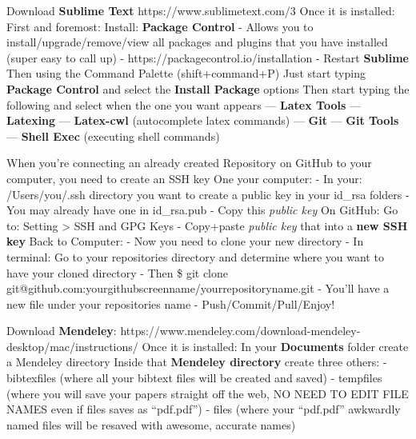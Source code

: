 Download \textbf{Sublime Text} 
https://www.sublimetext.com/3
Once it is installed:
First and foremost: Install: \textbf{Package Control}
- Allows you to install/upgrade/remove/view all packages and plugins that you have installed (super easy to call up)
- https://packagecontrol.io/installation
- Restart \textbf{Sublime}
Then using the Command Palette (shift+command+P)
Just start typing \textbf{Package Control} and select the \textbf{Install Package} options
Then start typing the following and select when the one you want appears
— \textbf{Latex Tools}
— \textbf{Latexing}
— \textbf{Latex-cwl} (autocomplete latex commands)
— \textbf{Git}
— \textbf{Git Tools}
— \textbf{Shell Exec} (executing shell commands)


When you're connecting an already created Repository on GitHub to your computer, you need to create an SSH key
One your computer:
- In your: /Users/you/.ssh directory you want to create a public key in your id_rsa folders
- You may already have one in id_rsa.pub
- Copy this \textit{public key}
On GitHub:
Go to: Setting > SSH and GPG Keys
- Copy+paste \textit{public key} that into a \textbf{new SSH key}
Back to Computer:
- Now you need to clone your new directory
- In terminal: Go to your repositories directory and determine where you want to have your cloned directory
- Then \$ git clone git@github.com:yourgithubscreenname/yourrepositoryname.git
- You'll have a new file under your repositories name
- Push/Commit/Pull/Enjoy!


Download \textbf{Mendeley}:
https://www.mendeley.com/download-mendeley-desktop/mac/instructions/
Once it is installed: 
In your \textbf{Documents} folder create a Mendeley directory
Inside that \textbf{Mendeley directory} create three others:
- bibtexfiles (where all your bibtext files will be created and saved)
- tempfiles   (where you will save your papers straight off the web, NO NEED TO EDIT FILE NAMES even if files saves as ``pdf.pdf'')
- files       (where your ``pdf.pdf'' awkwardly named files will be resaved with awesome, accurate names)

